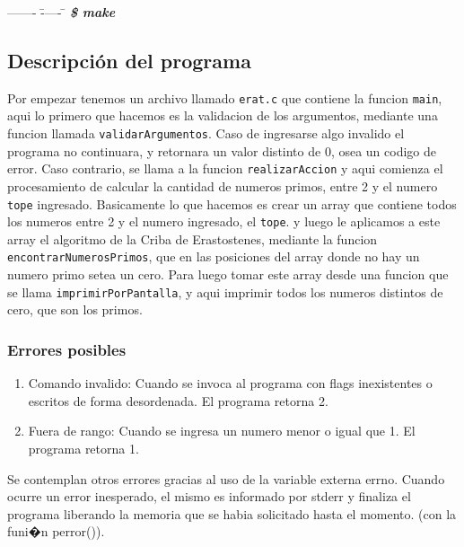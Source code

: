 \documentclass[a4paper,10pt]{article}
\begin{document}
\begin{tabbing}
------- \= ----- \= \kill
\> \textbf{\emph{\$ make}}\\ 
\end{tabbing}

\subsection {{\normalsize Descripción del programa}}

Por empezar tenemos un archivo llamado \texttt{erat.c} que contiene la funcion
\texttt{main}, aqui lo primero que hacemos es la validacion de los argumentos, mediante 
una funcion llamada \texttt{validarArgumentos}. Caso de ingresarse algo invalido 
el programa no continuara, y retornara un valor distinto de 0, osea un codigo de error. Caso contrario, 
se llama a la funcion \texttt{realizarAccion} y aqui comienza el procesamiento de calcular 
la cantidad de numeros primos, entre 2 y el numero \texttt{tope} ingresado. Basicamente lo que hacemos es 
crear un array que contiene todos los numeros entre 2 y el numero ingresado, el \texttt{tope}. 
y luego le aplicamos a este array el algoritmo de la Criba de Erastostenes, mediante la funcion \texttt{encontrarNumerosPrimos},
que en las posiciones del array donde no hay un numero primo setea un cero.
Para luego tomar este array desde una funcion que se llama \texttt{imprimirPorPantalla}, y aqui imprimir todos los numeros distintos
de cero, que son los primos.

\subsubsection {{\normalsize Errores posibles}}

\begin{enumerate}
\item Comando invalido: Cuando se invoca al programa con flags inexistentes o escritos de forma desordenada. El programa retorna 2.
\item Fuera de rango: Cuando se ingresa un numero menor o igual que 1. El programa retorna 1. 
\end{enumerate}

Se contemplan otros errores gracias al uso de la variable externa errno. 
Cuando ocurre un error inesperado, el mismo es informado por stderr y finaliza el programa
liberando la memoria que se habia solicitado hasta el momento.
(con la funi�n perror()).
\end{document}
